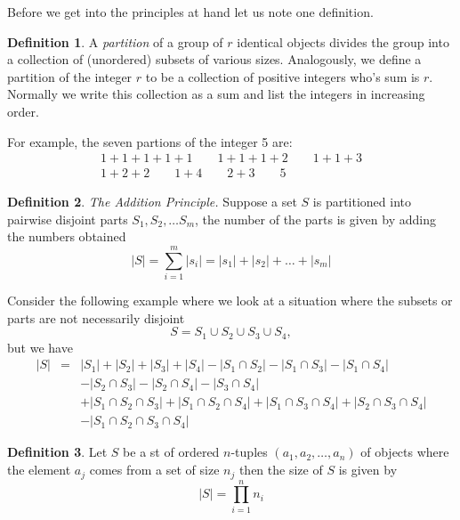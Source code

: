 \documentclass[12pt]{amsart}
\theoremstyle{definition}
\newtheorem{definition}{Definition}
\begin{document}
\begin{onehalfspace}
        Before we get into the principles at hand let us note one definition.
        \begin{definition}
            A \emph{partition} of a group of $r$ identical objects divides the group into a collection
            of (unordered) subsets of various sizes. Analogously, we define a partition of the integer $r$ to be a
            collection of positive integers who's sum is $r$. Normally we write this collection as a sum and list the
            integers in increasing order.
        \end{definition}
        For example, the seven partions of the integer 5 are:
        \begin{eqnarray*}
            1 + 1 + 1 + 1 + 1  \qquad  1 + 1 + 1 + 2 \qquad 1 + 1 + 3 \\
            1 + 2 + 2 \qquad 1 + 4 \qquad 2 + 3 \qquad 5
        \end{eqnarray*}

        \begin{definition}
            \emph{The Addition Principle.} Suppose a set $S$ is partitioned into pairwise disjoint parts
             $S_1, S_2, \ldots S_m$, the number of the parts is given by adding the numbers obtained
            \begin{displaymath}
                |S| = \sum_{i=1}^m |s_i| = |s_1| + |s_2| + \ldots + |s_m|
            \end{displaymath}
        \end{definition}

        Consider the following example where we look at a situation where the subsets or parts are not necessarily disjoint
        \begin{displaymath}
            S = S_1 \cup S_2 \cup S_3 \cup S_4,
        \end{displaymath}
        but we have
        \begin{eqnarray*}
            |S| & = & |S_1| + |S_2| + |S_3| + |S_4| - |S_1 \cap S_2| - |S_1 \cap S_3| - |S_1 \cap S_4| \\
                &  &  - |S_2 \cap S_3 | - |S_2 \cap S_4| - |S_3 \cap S_4| \\
                &  &  + | S_1 \cap S_2 \cap S_3| + |S_1 \cap S_2 \cap S_4| + |S_1 \cap S_3 \cap S_4| + |S_2 \cap S_3 \cap S_4| \\
                &  &  - |S_1 \cap S_2 \cap S_3 \cap S_4|
        \end{eqnarray*}

        \begin{definition}
            Let $S$ be a st of ordered $n$-tuples $(a_1, a_2, \ldots, a_n)$ of objects where the element $a_j$ comes
            from a set of size $n_j$ then the size of $S$ is given by
            \begin{displaymath}
                |S| = \prod_{i=1}^n n_i
            \end{displaymath}
        \end{definition}


\end{onehalfspace}
\end{document}
